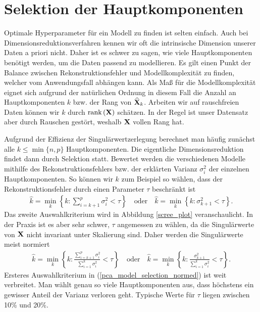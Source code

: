 

\section{Selektion der Hauptkomponenten}
\label{selection_principal_components}

Optimale Hyperparameter für ein Modell zu finden ist selten einfach. Auch bei Dimensionsreduktionsverfahren kennen wir oft die intrinsische Dimension unserer Daten a priori nicht. Daher ist es schwer zu sagen, wie viele Hauptkomponenten benötigt werden, um die Daten passend zu modellieren. Es gilt einen Punkt der Balance zwischen Rekonstruktionsfehler und Modellkomplexität zu finden, welcher vom Anwendungsfall abhängen kann. Als Maß für die Modellkomplexität eignet sich aufgrund der natürlichen Ordnung in diesem Fall die Anzahl an Hauptkomponenten $k$ bzw. der Rang von $\widehat{\mathbf{X}}_k$. Arbeiten wir auf rauschfreien Daten können wir $k$ durch $\text{rank} \left( \mathbf{X} \right)$ schätzen. In der Regel ist unser Datensatz aber durch Rauschen gestört, weshalb $\mathbf{X}$ vollen Rang hat.

Aufgrund der Effizienz der Singulärwertzerlegung berechnet man häufig zunächst alle $k \leq \min\{n, p\}$ Hauptkomponenten. Die eigentliche Dimensionsreduktion findet dann durch Selektion statt. Bewertet werden die verschiedenen Modelle mithilfe des Rekonstruktionsfehlers bzw. der erklärten Varianz $\sigma_i^2$ der einzelnen Hauptkomponenten. So können wir $k$ zum Beispiel so wählen, dass der Rekonstruktionsfehler durch einen Parameter $\tau$ beschränkt ist
\begin{align}
\label{pca_model_selection}
\widehat{k} = \min_k \left\{k \colon \sum_{i = k+1}^{p} \sigma_i^2 < \tau \right\} \quad \text{oder} \quad \widehat{k} = \min_k \left\{k \colon \sigma_{k+1}^2 < \tau \right\}.
\end{align}
Das zweite Auswahlkriterium wird in Abbildung \ref{scree_plot} veranschaulicht. In der Praxis ist es aber sehr schwer, $\tau$ angemessen zu wählen, da die Singulärwerte von $\mathbf{X}$ nicht invariant unter Skalierung sind. Daher werden die Singulärwerte meist normiert
\begin{align}
\label{pca_model_selection_normed}
\widehat{k} = \min_k \left\{k \colon \frac{\sum_{i = k+1}^{p} \sigma_i^2}{\sum_{i=1}^k \sigma_i^2} < \tau \right\} \quad \text{oder} \quad \widehat{k} = \min_k \left\{k \colon \frac{\sigma_{k+1}^2}{\sum_{i=1}^k \sigma_i^2} < \tau \right\}.
\end{align}
Ersteres Auswahlkriterium in (\ref{pca_model_selection_normed}) ist weit verbreitet. Man wählt genau so viele Hauptkomponenten aus, dass höchstens ein gewisser Anteil der Varianz verloren geht. Typische Werte für $\tau$ liegen zwischen 10\% und 20\%. 

